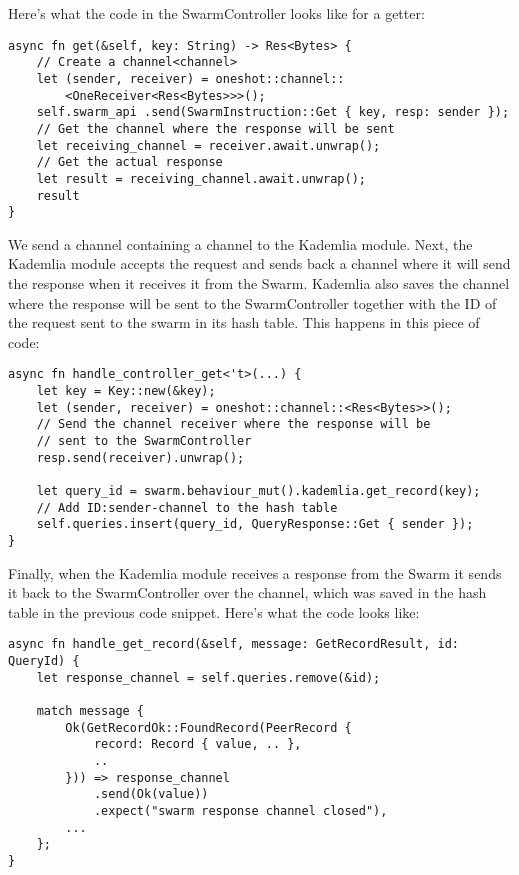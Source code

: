 \documentclass[ twoside,openright,titlepage,numbers=noenddot,headinclude,%
                footinclude=true,cleardoublepage=empty,abstractoff, %
                BCOR=5mm,paper=a4,fontsize=11pt,%
                ngerman,american,%
                ]{scrreprt}
\begin{document}
Here's what the code in the SwarmController looks like for a getter:

\begin{verbatim}
async fn get(&self, key: String) -> Res<Bytes> {
    // Create a channel<channel>
    let (sender, receiver) = oneshot::channel::
        <OneReceiver<Res<Bytes>>>();
    self.swarm_api .send(SwarmInstruction::Get { key, resp: sender });
    // Get the channel where the response will be sent
    let receiving_channel = receiver.await.unwrap();
    // Get the actual response
    let result = receiving_channel.await.unwrap();
    result
}
\end{verbatim}

We send a channel containing a channel to the Kademlia module.
Next, the Kademlia module accepts the request and sends back a
channel where it will send the response when it receives it from the Swarm.
Kademlia also saves the channel where the response will be sent to the SwarmController
together with the ID of the request sent to the swarm in its hash table.
This happens in this piece of code:

\begin{verbatim}
async fn handle_controller_get<'t>(...) {
    let key = Key::new(&key);
    let (sender, receiver) = oneshot::channel::<Res<Bytes>>();
    // Send the channel receiver where the response will be
    // sent to the SwarmController
    resp.send(receiver).unwrap();

    let query_id = swarm.behaviour_mut().kademlia.get_record(key);
    // Add ID:sender-channel to the hash table
    self.queries.insert(query_id, QueryResponse::Get { sender });
}
\end{verbatim}

Finally, when the Kademlia module receives a response from the Swarm it sends it back to the SwarmController
over the channel, which was saved in the hash table in the previous code snippet.
Here's what the code looks like:

\begin{verbatim}
async fn handle_get_record(&self, message: GetRecordResult, id: QueryId) {
    let response_channel = self.queries.remove(&id);

    match message {
        Ok(GetRecordOk::FoundRecord(PeerRecord {
            record: Record { value, .. },
            ..
        })) => response_channel
            .send(Ok(value))
            .expect("swarm response channel closed"),
        ...
    };
}
\end{verbatim}
\end{document}
